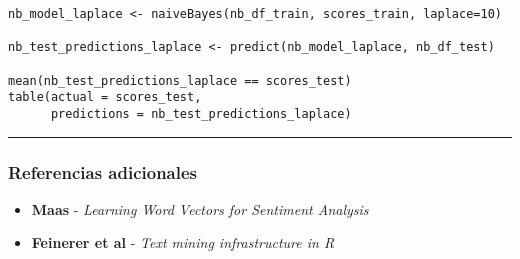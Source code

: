 \documentclass[11pt,]{article}
\begin{document}
\begin{verbatim}
nb_model_laplace <- naiveBayes(nb_df_train, scores_train, laplace=10)

nb_test_predictions_laplace <- predict(nb_model_laplace, nb_df_test)

mean(nb_test_predictions_laplace == scores_test)
table(actual = scores_test, 
      predictions = nb_test_predictions_laplace)
\end{verbatim}

\begin{center}\rule{0.5\linewidth}{\linethickness}\end{center}

\subsubsection{Referencias adicionales}\label{referencias-adicionales}

\begin{itemize}
\item
  \textbf{Maas} - \emph{Learning Word Vectors for Sentiment Analysis}
\item
  \textbf{Feinerer et al} - \emph{Text mining infrastructure in R}
\end{itemize}




\newpage
\singlespacing 
\end{document}
